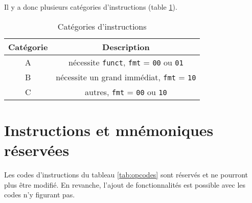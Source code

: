 Il y a donc plusieurs catégories d'instructions (table \ref{tab:instructions_types}).

\begin{table}[ht]
    \centering
    \begin{tabular}{cc}
    \toprule
    Catégorie & Description \\
    \midrule
    A & nécessite \texttt{funct}, \texttt{fmt} = \texttt{00} ou \texttt{01} \\
    B & nécessite un grand immédiat, \texttt{fmt} = \texttt{10} \\
    C & autres, \texttt{fmt} = \texttt{00} ou \texttt{10} \\
    \bottomrule
    \end{tabular}
    \caption{Catégories d'instructions}
    \label{tab:instructions_types}
\end{table}

\section{Instructions et mnémoniques réservées}

Les codes d'instructions du tableau \ref{tab:opcodes} sont réservés et ne
pourront plus être modifié. En revanche, l'ajout de fonctionnalités est possible
avec les codes n'y figurant pas.

